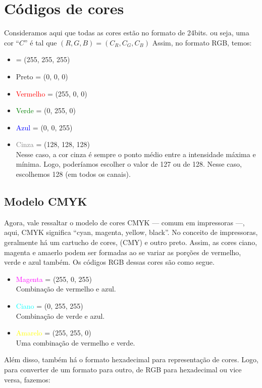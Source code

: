 \documentclass[a4paper, 12pt]{article}
\begin{document}
\section{Códigos de cores}
Consideramos aqui que todas as cores estão no formato de 24bits. ou seja, uma cor ``$C$'' é tal que $(R, G, B) = (C_R, C_G, C_B)$
Assim, no formato RGB, temos:
\begin{itemize}
	\item {} = (255, 255, 255)
 \item Preto = (0, 0, 0)
 \item \textcolor{red}{Vermelho} = (255, 0, 0)
 \item \textcolor{green}{Verde} = (0, 255, 0)
 \item \textcolor{blue}{Azul} = (0, 0, 255)
 \item \textcolor{gray}{Cinza} = (128, 128, 128)
		\\
		Nesse caso, a cor cinza é sempre o ponto médio entre a intensidade máxima e mínima. Logo, poderíamos escolher o valor 
		de 127 ou de 128. Nesse caso, escolhemos 128 (em todos os canais).
\end{itemize}

\subsection{Modelo CMYK}
Agora, vale ressaltar o modelo de cores CMYK --- comum em impressoras ---, aqui, CMYK significa ``cyan, magenta, yellow, black''. No conceito de impressoras,
geralmente há um cartucho de cores, (CMY) e outro preto. Assim, as cores ciano, magenta e amaerlo podem ser formadas ao se variar as porções de 
vermelho, verde e azul também. Os códigos RGB dessas cores são como segue.

\begin{itemize}
 \item \textcolor{magenta}{Magenta} = (255, 0, 255)
 \\
 Combinação de vermelho e azul.
 \item \textcolor{cyan}{Ciano} = (0, 255, 255)
 \\
 Combinação de verde e azul.
 \item \textcolor{yellow}{Amarelo} = (255, 255, 0)
 \\
 Uma combinação de vermelho e verde.
\end{itemize}

Além disso, também há o formato hexadecimal para representação de cores. Logo, para converter de um formato para outro, de RGB para hexadecimal ou 
vice versa, fazemos:
\end{document}
